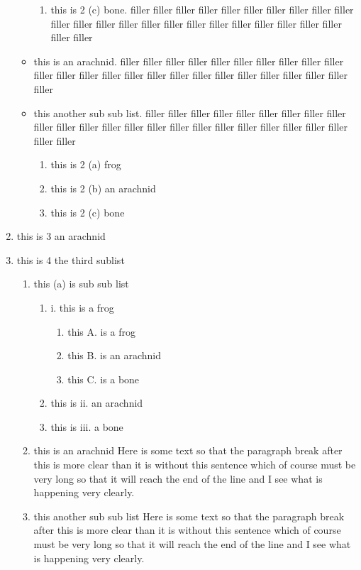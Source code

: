 \documentclass{article}
\begin{document}
\begin{enumerate}
\begin{itemize}
\begin{enumerate}
      \item this is 2 (c) bone. filler filler filler filler filler filler filler filler filler filler filler filler filler filler filler filler filler filler filler filler filler filler filler filler filler 
      \end{enumerate}
   \item this is an arachnid. filler filler filler filler filler filler filler filler filler filler filler filler filler filler filler filler filler filler filler filler filler filler filler filler filler 
   \item this another sub sub list. filler filler filler filler filler filler filler filler filler filler filler filler filler filler filler filler filler filler filler filler filler filler filler filler filler 
      \begin{enumerate}
      \item this is 2 (a) frog
      \item this is 2 (b) an arachnid
      \item this is 2 (c) bone
      \end{enumerate}
   \end{itemize}
\item this is 3 an arachnid
\item this is 4 the third sublist
   \begin{enumerate}
   \item this (a) is sub sub list
      \begin{enumerate}
      \item  i. this is a frog
          \begin{enumerate}
          \item this A. is a frog
          \item this B. is an arachnid
          \item this C. is a bone
          \end{enumerate}
      \item this is ii. an arachnid
      \item this is iii. a bone
      \end{enumerate}
   \item this is an arachnid Here is some text so that the paragraph break after this
is more clear than it is without this sentence which of
course must be very long so that it will reach the end of
the line and I see what is happening very clearly.

   \item this another sub sub list Here is some text so that the paragraph break after this
is more clear than it is without this sentence which of
course must be very long so that it will reach the end of
the line and I see what is happening very clearly.


\end{enumerate}
\end{enumerate}
\end{document}
